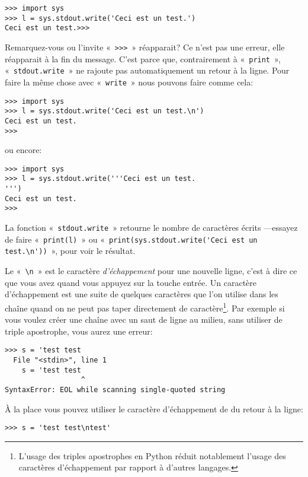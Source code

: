\begin{Verbatim}[frame=single,rulecolor=\color{gray}]
>>> import sys
>>> l = sys.stdout.write('Ceci est un test.')
Ceci est un test.>>>
\end{Verbatim}

Remarquez-vous ou l'invite « \texttt{>>>} » réapparait? Ce n'est pas une erreur, elle réapparait à la fin du message. C'est parce que, contrairement à « \texttt{print} », « \texttt{stdout.write} » ne rajoute pas automatiquement un retour à la ligne. Pour faire la même chose avec « \texttt{write} »  nous pouvons faire comme cela:

\begin{Verbatim}[frame=single,rulecolor=\color{gray}]
>>> import sys
>>> l = sys.stdout.write('Ceci est un test.\n')
Ceci est un test.
>>>
\end{Verbatim}
ou encore: 
\begin{Verbatim}[frame=single,rulecolor=\color{gray}]
>>> import sys
>>> l = sys.stdout.write('''Ceci est un test.
''')
Ceci est un test.
>>>
\end{Verbatim}

La fonction « \texttt{stdout.write} » retourne le nombre de caractères écrits ---essayez de faire « \texttt{print(l)} » ou « \verb+print(sys.stdout.write('Ceci est un test.\n'))+ », pour voir le résultat.

Le « \texttt{{\textbackslash}n} » est le caractère \emph{d'échappement} pour une nouvelle ligne, c'est à dire ce que vous avez quand vous appuyez sur la touche entrée. Un caractère d'échappement est une suite de quelques caractères que l'on utilise dans les chaîne quand on ne peut pas taper directement de caractère\footnote{L'usage des triples apostrophes en Python réduit notablement l'usage des caractères d'échappement par rapport à d'autres langages.}. Par exemple si vous voulez créer une chaîne avec un saut de ligne au milieu, sans utiliser de triple apostrophe, vous aurez une erreur:
\begin{Verbatim}[frame=single,rulecolor=\color{red},label=ne fonctionne pas]
>>> s = 'test test 
  File "<stdin>", line 1
    s = 'test test 
                  ^
SyntaxError: EOL while scanning single-quoted string
\end{Verbatim}

À la place vous pouvez utiliser le caractère d'échappement de du retour à la ligne:

\begin{Verbatim}[frame=single,rulecolor=\color{gray}]
>>> s = 'test test\ntest'
\end{Verbatim}


